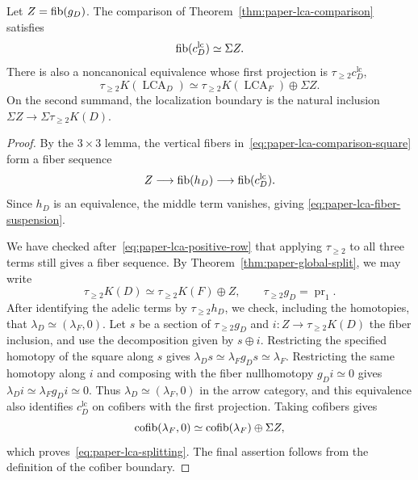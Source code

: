 \begin{theorem}
\label{thm:paper-lca-fiber-splitting}
Let $Z=\operatorname{fib}(g_D)$.
The comparison of Theorem~\ref{thm:paper-lca-comparison} satisfies
\begin{equation}\label{eq:paper-lca-fiber-suspension}
 \operatorname{fib}(c^{\mathrm{lc}}_D)\simeq\Sigma Z.
\end{equation}
There is also a noncanonical equivalence whose first projection is $\tau_{\ge2}c^{\mathrm{lc}}_D$,
\begin{equation}\label{eq:paper-lca-splitting}
 \tau_{\ge2}K(\operatorname{LCA}_D)
 \simeq\tau_{\ge2}K(\operatorname{LCA}_F)\oplus\Sigma Z.
\end{equation}
On the second summand, the localization boundary is the natural inclusion $\Sigma Z\to\Sigma\tau_{\ge2}K(D)$.
\end{theorem}
\begin{proof}
By the $3\times3$ lemma, the vertical fibers in~\eqref{eq:paper-lca-comparison-square} form a fiber sequence
\[
 Z\longrightarrow\operatorname{fib}(h_D)\longrightarrow\operatorname{fib}(c^{\mathrm{lc}}_D).
\]
Since $h_D$ is an equivalence, the middle term vanishes, giving \eqref{eq:paper-lca-fiber-suspension}.

We have checked after~\eqref{eq:paper-lca-positive-row} that applying $\tau_{\ge2}$ to all three terms still gives a fiber sequence.
By Theorem~\ref{thm:paper-global-split}, we may write
\[
 \tau_{\ge2}K(D)\simeq\tau_{\ge2}K(F)\oplus Z,
 \qquad\tau_{\ge2}g_D=\operatorname{pr}_1.
\]
After identifying the adelic terms by $\tau_{\ge2}h_D$, we check, including the homotopies, that $\lambda_D\simeq(\lambda_F,0)$.
Let $s$ be a section of $\tau_{\ge2}g_D$ and $i\colon Z\to\tau_{\ge2}K(D)$ the fiber inclusion, and use the decomposition given by $s\oplus i$.
Restricting the specified homotopy of the square along $s$ gives $\lambda_Ds\simeq\lambda_Fg_Ds\simeq\lambda_F$.
Restricting the same homotopy along $i$ and composing with the fiber nullhomotopy $g_Di\simeq0$ gives $\lambda_Di\simeq\lambda_Fg_Di\simeq0$.
Thus $\lambda_D\simeq(\lambda_F,0)$ in the arrow category, and this equivalence also identifies $c^{\mathrm{lc}}_D$ on cofibers with the first projection.
Taking cofibers gives
\[
 \operatorname{cofib}(\lambda_F,0)\simeq\operatorname{cofib}(\lambda_F)\oplus\Sigma Z,
\]
which proves~\eqref{eq:paper-lca-splitting}.
The final assertion follows from the definition of the cofiber boundary.
\end{proof}

